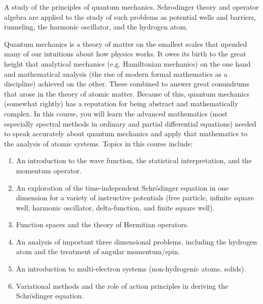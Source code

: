 \documentclass{syllabus}
\begin{document}
A study of the principles of quantum mechanics. Schrodinger theory and operator algebra are applied to the study of such problems as potential wells and barriers, tunneling, the harmonic oscillator, and the hydrogen atom.

Quantum mechanics is a theory of matter on the smallest scales that upended many of our intuitions about how physics works. It owes its birth to the great height that analytical mechanics (e.g. Hamiltonian mechanics) on the one hand and mathematical analysis (the rise of modern formal mathematics as a discipline) achieved on the other. These combined to answer great conundrums that arose in the theory of atomic matter. Because of this, quantum mechanics (somewhat rightly) has a reputation for being abstract and mathematically complex. In this course, you will learn the advanced mathematics (most especially spectral methods in ordinary and partial differential equations) needed to speak accurately about quantum mechanics and apply that mathematics to the analysis of atomic systems. Topics in this course include:

\begin{enumerate}[label=\textcolor{CarthageDark}{\bfseries\arabic*.}]
    \item An introduction to the wave function, the statistical interpretation, and the momentum operator.
\item An exploration of the time-independent Schrödinger equation in one dimension for a variety of instructive potentials (free particle, infinite square well, harmonic oscillator, delta-function, and finite square well).
\item Function spaces and the theory of Hermitian operators.
\item An analysis of important three dimensional problems, including the hydrogen atom and the treatment of angular momentum/spin.
\item An introduction to multi-electron systems (non-hydrogenic atoms, solids).
\item Variational methods and the role of action principles in deriving the Schrödinger equation.
\end{enumerate}
\end{document}
